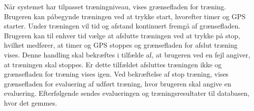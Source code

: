 \noindent
Når systemet har tilpasset træningniveau, vises grænsefladen for træning. Brugeren kan påbegynde træningen ved at trykke start, hvorefter timer og GPS starter. Under træningen vil tid og afstand kontinuert fremgå af grænsefladen. Brugeren kan til enhver tid vælge at afslutte træningen ved at trykke på stop, hvilket medfører, at timer og GPS stoppes og grænsefladen for afslut træning vises. Denne handling skal bekræftes i tilfælde af, at brugeren ved en fejl angiver, at træningen skal stoppes. Er dette tilfældet afsluttes træningen ikke og grænsefladen for træning vises igen. Ved bekræftelse af stop træning, vises grænsefladen for evaluering af udført træning, hvor brugeren skal angive en evaluering. Efterfølgende sendes evalueringen og træningsresultater til databasen, hvor det gemmes.

